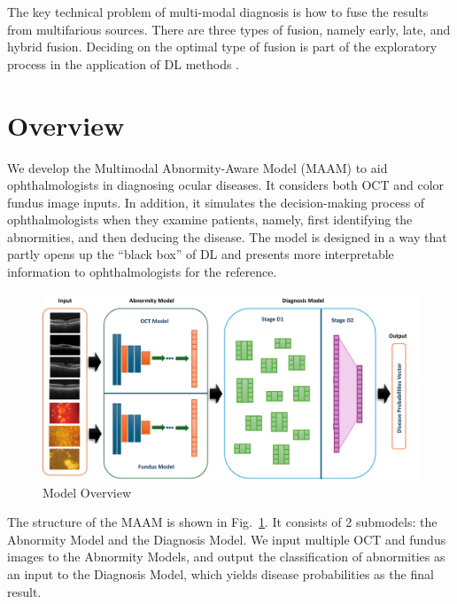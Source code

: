 \documentclass{article}
\begin{document}
	The key technical problem of multi-modal diagnosis is how to fuse the results from multifarious sources. There are three types of fusion, namely early, late, and hybrid fusion. Deciding on the optimal type of fusion is part of the exploratory process in the application of DL methods \autocite{Ichhpujani_Thakur_2021}.
	
	
	
	\section{Overview}
	
	We develop the Multimodal Abnormity-Aware Model (MAAM) to aid ophthalmologists in diagnosing ocular diseases. It considers both OCT and color fundus image inputs. In addition, it simulates the decision-making process of ophthalmologists when they examine patients, namely, first identifying the abnormities, and then deducing the disease. The model is designed in a way that partly opens up the ``black box'' of DL and presents more interpretable information to ophthalmologists for the reference. 
	
	\begin{figure}[htbp]
		\centering
		\includegraphics[width=\linewidth]{Figs/model_overview.pdf}
		\caption{Model Overview}
		\vspace{0.3cm}
		\label{fig:3_parts}
	\end{figure}
	
	The structure of the MAAM is shown in Fig.~\ref{fig:3_parts}. It consists of 2 submodels: the Abnormity Model and the Diagnosis Model. We input multiple OCT and fundus images to the Abnormity Models, and output the classification of abnormities as an input to the Diagnosis Model, which yields disease probabilities as the final result.
	
	\vspace{0.5cm}
	
\end{document}
